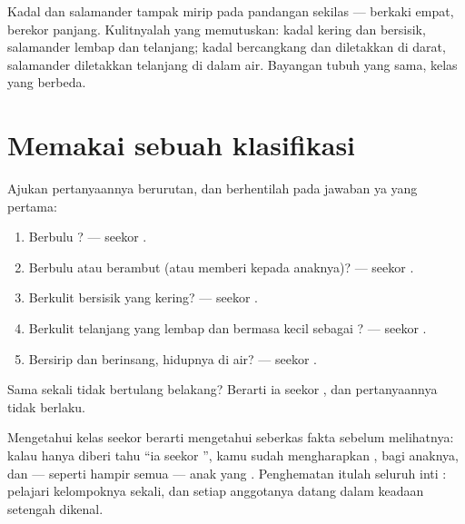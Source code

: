 \begin{remark}\label{rem:g4:classifying-animals:confusion}
Kadal dan salamander tampak mirip pada pandangan sekilas --- berkaki
empat, berekor panjang. Kulitnyalah yang memutuskan:  kadal
kering dan bersisik,  salamander lembap dan telanjang; 
kadal bercangkang dan diletakkan di darat,  salamander diletakkan
telanjang di dalam air. Bayangan tubuh yang sama, kelas yang berbeda.
\end{remark}

\section{Memakai sebuah klasifikasi}

\begin{method}\label{met:g4:classifying-animals:place}
Ajukan pertanyaannya berurutan, dan berhentilah pada jawaban ya yang
pertama:
\begin{enumerate}
  \item Berbulu ? --- seekor .
  \item Berbulu atau berambut (atau memberi  kepada anaknya)? ---
        seekor .
  \item Berkulit bersisik yang kering? --- seekor .
  \item Berkulit telanjang yang lembap dan bermasa kecil sebagai
        ? --- seekor .
  \item Bersirip dan berinsang, hidupnya di air? --- seekor .
\end{enumerate}
Sama sekali tidak bertulang belakang? Berarti ia seekor ,
dan pertanyaannya tidak berlaku.
\end{method}

\begin{proposition}\label{prop:g4:classifying-animals:free}
Mengetahui kelas seekor  berarti mengetahui seberkas fakta
sebelum melihatnya: kalau hanya diberi tahu ``ia seekor '',
kamu sudah mengharapkan ,  bagi anaknya, dan --- seperti
hampir semua  --- anak yang . Penghematan itulah
seluruh inti : pelajari kelompoknya sekali, dan setiap
anggotanya datang dalam keadaan setengah dikenal.
\end{proposition}
\admitted

